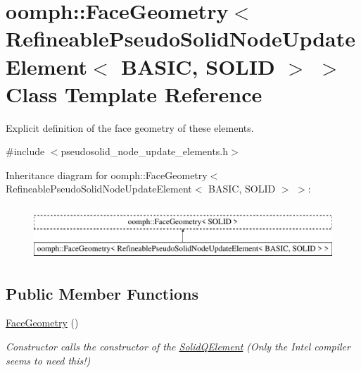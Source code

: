 \hypertarget{classoomph_1_1FaceGeometry_3_01RefineablePseudoSolidNodeUpdateElement_3_01BASIC_00_01SOLID_01_4_01_4}{}\section{oomph\+:\+:Face\+Geometry$<$ Refineable\+Pseudo\+Solid\+Node\+Update\+Element$<$ B\+A\+S\+IC, S\+O\+L\+ID $>$ $>$ Class Template Reference}
\label{classoomph_1_1FaceGeometry_3_01RefineablePseudoSolidNodeUpdateElement_3_01BASIC_00_01SOLID_01_4_01_4}


Explicit definition of the face geometry of these elements.  




{\ttfamily \#include $<$pseudosolid\+\_\+node\+\_\+update\+\_\+elements.\+h$>$}

Inheritance diagram for oomph\+:\+:Face\+Geometry$<$ Refineable\+Pseudo\+Solid\+Node\+Update\+Element$<$ B\+A\+S\+IC, S\+O\+L\+ID $>$ $>$\+:\begin{figure}[H]
\begin{center}
\leavevmode
\includegraphics[height=2.000000cm]{classoomph_1_1FaceGeometry_3_01RefineablePseudoSolidNodeUpdateElement_3_01BASIC_00_01SOLID_01_4_01_4}
\end{center}
\end{figure}
\subsection*{Public Member Functions}
\begin{DoxyCompactItemize}
\item 
\hyperlink{classoomph_1_1FaceGeometry_3_01RefineablePseudoSolidNodeUpdateElement_3_01BASIC_00_01SOLID_01_4_01_4_aa03d04632af1d3cdb9b98f85a2a1a344}{Face\+Geometry} ()
\begin{DoxyCompactList}\small\item\em Constructor calls the constructor of the \hyperlink{classoomph_1_1SolidQElement}{Solid\+Q\+Element} (Only the Intel compiler seems to need this!) \end{DoxyCompactList}\end{DoxyCompactItemize}


